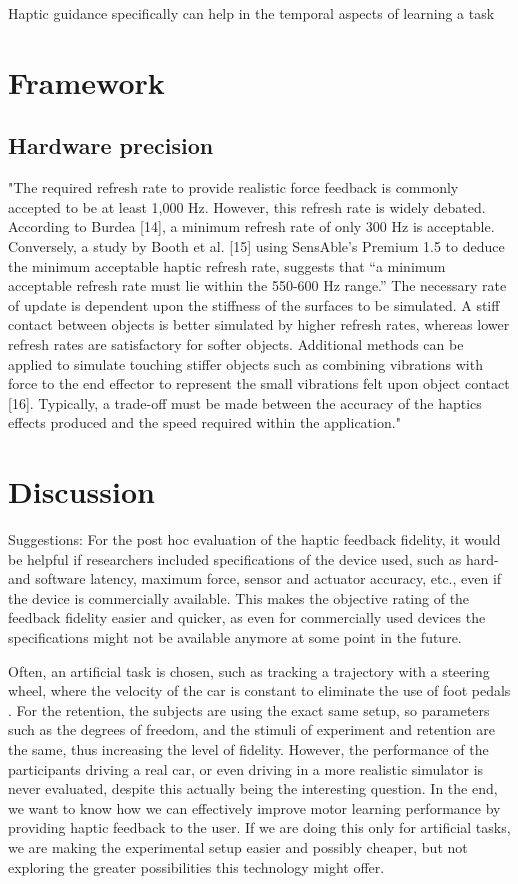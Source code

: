 \documentclass[conference]{IEEEtran}
\begin{document}
Haptic guidance specifically can help in the temporal aspects of learning a task \cite{Feygin2002HapticSkill} 

\section{Framework}

\subsection{Hardware precision}
"The required refresh rate to provide realistic
force feedback is commonly accepted to be at least 1,000 Hz.
However, this refresh rate is widely debated. According to
Burdea [14], a minimum refresh rate of only 300 Hz is
acceptable. Conversely, a study by Booth et al. [15] using
SensAble’s Premium 1.5 to deduce the minimum acceptable
haptic refresh rate, suggests that “a minimum acceptable
refresh rate must lie within the 550-600 Hz range.” The
necessary rate of update is dependent upon the stiffness of
the surfaces to be simulated. A stiff contact between objects is
better simulated by higher refresh rates, whereas lower
refresh rates are satisfactory for softer objects. Additional
methods can be applied to simulate touching stiffer objects
such as combining vibrations with force to the end effector to
represent the small vibrations felt upon object contact [16].
Typically, a trade-off must be made between the accuracy of
the haptics effects produced and the speed required within
the application." \cite{Coles2011TheArt}

\section{Discussion}
Suggestions: For the post hoc evaluation of the haptic feedback fidelity, it would be helpful if researchers included specifications of the device used, such as hard- and software latency, maximum force, sensor and actuator accuracy, etc., even if the device is commercially available. This makes the objective rating of the feedback fidelity easier and quicker, as even for commercially used devices the specifications might not be available anymore at some point in the future.

Often, an artificial task is chosen, such as tracking a trajectory with a steering wheel, where the velocity of the car is constant to eliminate the use of foot pedals \cite{Lee2014CombiningTask}. For the retention, the subjects are using the exact same setup, so parameters such as the degrees of freedom, and the stimuli of experiment and retention are the same, thus increasing the level of fidelity. However, the performance of the participants driving a real car, or even driving in a more realistic simulator is never evaluated, despite this actually being the interesting question. In the end, we want to know how we can effectively improve motor learning performance by providing haptic feedback to the user. If we are doing this only for artificial tasks, we are making the experimental setup easier and possibly cheaper, but not exploring the greater possibilities this technology might offer. 
\end{document}
